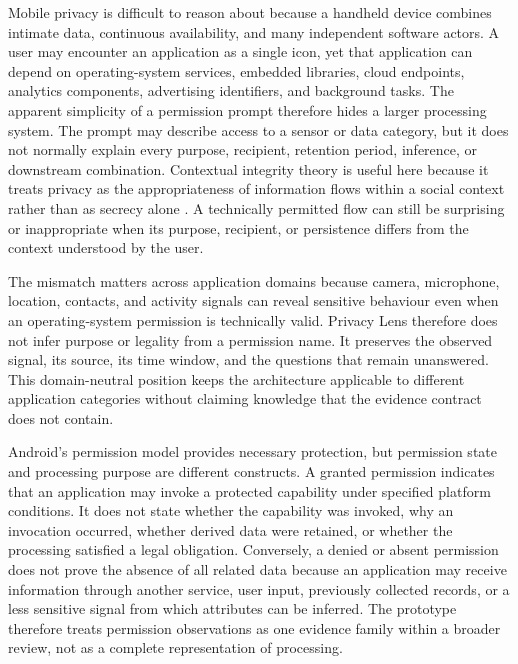 Mobile privacy is difficult to reason about because a handheld device combines intimate data, continuous availability, and many independent software actors. A user may encounter an application as a single icon, yet that application can depend on operating-system services, embedded libraries, cloud endpoints, analytics components, advertising identifiers, and background tasks. The apparent simplicity of a permission prompt therefore hides a larger processing system. The prompt may describe access to a sensor or data category, but it does not normally explain every purpose, recipient, retention period, inference, or downstream combination. Contextual integrity theory is useful here because it treats privacy as the appropriateness of information flows within a social context rather than as secrecy alone \cite{5}. A technically permitted flow can still be surprising or inappropriate when its purpose, recipient, or persistence differs from the context understood by the user.

The mismatch matters across application domains because camera, microphone, location, contacts, and activity signals can reveal sensitive behaviour even when an operating-system permission is technically valid. Privacy Lens therefore does not infer purpose or legality from a permission name. It preserves the observed signal, its source, its time window, and the questions that remain unanswered. This domain-neutral position keeps the architecture applicable to different application categories without claiming knowledge that the evidence contract does not contain.

Android's permission model provides necessary protection, but permission state and processing purpose are different constructs. A granted permission indicates that an application may invoke a protected capability under specified platform conditions. It does not state whether the capability was invoked, why an invocation occurred, whether derived data were retained, or whether the processing satisfied a legal obligation. Conversely, a denied or absent permission does not prove the absence of all related data because an application may receive information through another service, user input, previously collected records, or a less sensitive signal from which attributes can be inferred. The prototype therefore treats permission observations as one evidence family within a broader review, not as a complete representation of processing.


